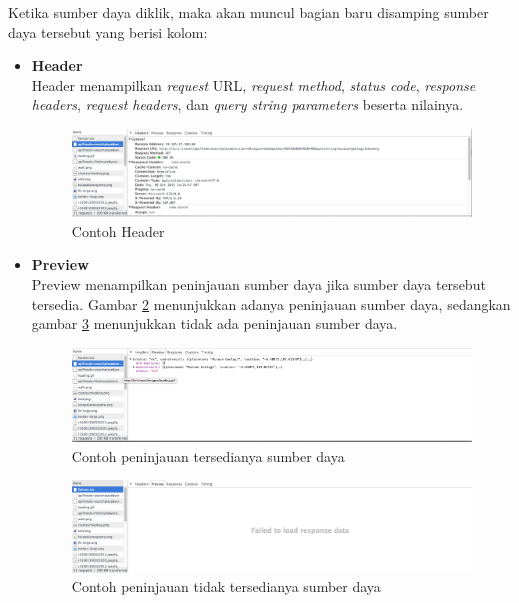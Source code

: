 Ketika sumber daya diklik, maka akan muncul bagian baru disamping sumber daya tersebut yang berisi kolom:
\begin{itemize}
	\item \textbf{Header}\\
			Header menampilkan \textit{request} URL, \textit{request method}, \textit{status code}, \textit{response headers}, \textit{request headers}, dan \textit{query string parameters} beserta nilainya.
			\begin{figure}[H]
				\centering
				\includegraphics[scale=0.3]{Gambar/devtools-network-header}
				\caption{Contoh Header} 
				\label{fig:2_devtools_network_header}
			\end{figure}
	\item \textbf{Preview}\\
			Preview menampilkan peninjauan sumber daya jika sumber daya tersebut tersedia. Gambar \ref{fig:2_devtools_network_preview_a} menunjukkan adanya peninjauan sumber daya, sedangkan gambar \ref{fig:2_devtools_network_preview_b} menunjukkan tidak ada peninjauan sumber daya.
			
			\begin{figure}[H]
				\centering
				\includegraphics[scale=0.3]{Gambar/devtools-network-preview-a}
				\caption{Contoh peninjauan tersedianya sumber daya} 
				\label{fig:2_devtools_network_preview_a}
			\end{figure}
			
			\begin{figure}[H]
				\centering
				\includegraphics[scale=0.3]{Gambar/devtools-network-preview-b}
				\caption{Contoh peninjauan  tidak tersedianya sumber daya} 
				\label{fig:2_devtools_network_preview_b}
			\end{figure}
			

\end{itemize}
